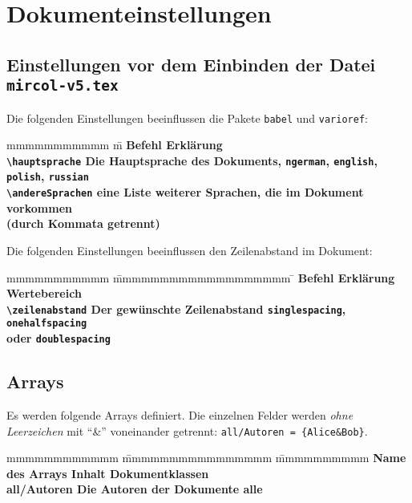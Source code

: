 	
	\section{Dokumenteinstellungen}
		\subsection{Einstellungen vor dem Einbinden der Datei \texttt{mircol-v5.tex}}
			Die folgenden Einstellungen beeinflussen die Pakete \texttt{babel} und \texttt{varioref}:
			\begin{tabbing}
				mmmmmmmmmmm 			\= m \kill
				\bf Befehl				\> \bf Erklärung \\
				\verb|\hauptsprache|	\> Die Hauptsprache des Dokuments, \zb \verb|ngerman|, \verb|english|, \\
										\> \verb|polish|, \verb|russian|  \\
				\verb|\andereSprachen|	\> eine Liste weiterer Sprachen, die im Dokument vorkommen \\
										\> (durch Kommata getrennt)
			\end{tabbing}
			Die folgenden Einstellungen beeinflussen den Zeilenabstand im Dokument:
			\begin{tabbing}
				mmmmmmmmmmm 			\= mmmmmmmmmmmmmmmmmmm \= \kill
				\bf Befehl				\> \bf Erklärung 				\> Wertebereich \\
				\verb|\zeilenabstand|	\> Der gewünschte Zeilenabstand \> \texttt{singlespacing}, \texttt{onehalfspacing} \\
										\>								\> oder \texttt{doublespacing}
			\end{tabbing}
			
		\subsection{Arrays}
			Es werden folgende Arrays definiert. Die einzelnen Felder werden \emph{ohne Leerzeichen} mit "`\&"' voneinander getrennt: \verb|all/Autoren = {Alice&Bob}|.
			\begin{tabbing}
				mmmmmmmmmmmm 		\= mmmmmmmmmmmmmmmm				\=	mmmmmmmmmm	\kill
				\bf Name des Arrays	\> \bf Inhalt 					\> \bf Dokumentklassen\\
				 all/Autoren		\> Die Autoren der Dokumente	\> alle
			\end{tabbing}
